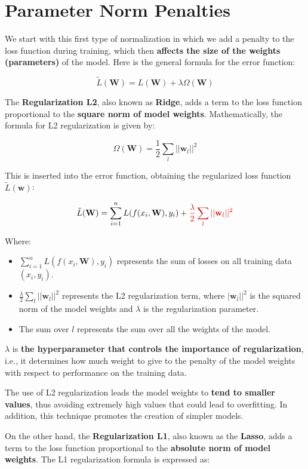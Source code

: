 \section{Parameter Norm Penalties}

We start with this first type of normalization in which we add a penalty to the loss function during training, which then \textbf{affects the size of the weights (parameters)} of the model. Here is the general formula for the error function:

$$
\tilde{L}(\mathbf{W}) = L(\mathbf{W}) + \lambda \Omega(\mathbf{W})
$$

The \textbf{\textcolor{myred}{Regularization L2}}, also known as \textbf{\textcolor{myred}{Ridge}}, adds a term to the loss function proportional to the \textbf{\textcolor{myred}{square norm of model weights}}. Mathematically, the formula for L2 regularization is given by:

$$
\Omega(\mathbf{W}) = \frac{1}{2} \sum_{l} ||\mathbf{w}_l||^2
$$

This is inserted into the error function, obtaining the regularized loss function $\tilde{L}(\mathbf{w})$:

$$
\tilde{L}(\mathbf{W}) = \sum_{i=1}^{n} L(f(x_i, \mathbf{W}), y_i) + \textcolor{myred}{\frac{\lambda}{2} \sum_{l} ||\mathbf{w}_l||^2}
$$

Where:
\begin{itemize}
    \item $\sum_{i=1}^{n} L(f(x_i, \mathbf{W}), y_i)$ represents the sum of losses on all training data $(x_i, y_i)$.
    \item $\frac{\lambda}{2} \sum_{l} ||\mathbf{w}_l||^2$ represents the L2 regularization term, where $|\mathbf{w}_l||^2$ is the squared norm of the model weights and $\lambda$ is the regularization parameter.
    \item The sum over $l$ represents the sum over all the weights of the model.
\end{itemize}

$\lambda$ is \textbf{the hyperparameter that controls the importance of regularization}, i.e., it determines how much weight to give to the penalty of the model weights with respect to performance on the training data.

The use of L2 regularization leads the model weights to \textbf{tend to smaller values}, thus avoiding extremely high values that could lead to overfitting. In addition, this technique promotes the creation of simpler models.

On the other hand, the \textbf{\textcolor{mygreen!90!black}{Regularization L1}}, also known as the \textbf{\textcolor{mygreen!90!black}{Lasso}}, adds a term to the loss function proportional to the \textbf{\textcolor{mygreen!90!black}{absolute norm of model weights}}. The L1 regularization formula is expressed as:

